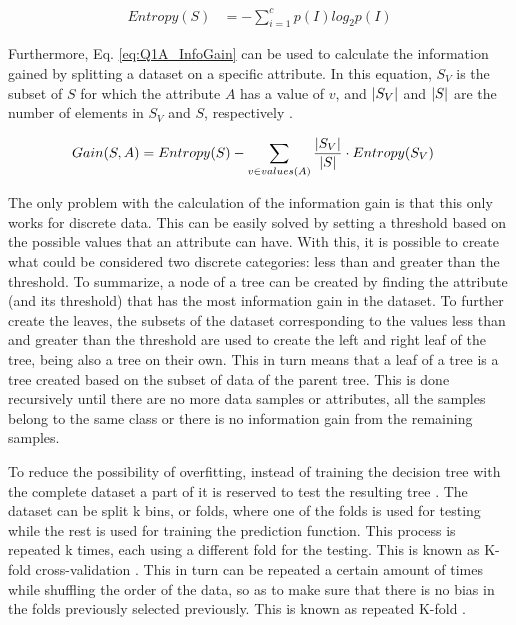 \documentclass{article}
\begin{document}
\begin{align}
    \label{eq:Q1A_Entropy}
    Entropy(S) &= -\sum_{i=1}^{c}p(I) log_2 p(I)
\end{align}

Furthermore, Eq. \ref{eq:Q1A_InfoGain} can be used to calculate the information gained by splitting a dataset on a specific attribute. In this equation, $S_V$ is the subset of $S$ for which the attribute $A$ has a value of $v$, and $\abs{S_V}$ and $\abs{S}$ are the number of elements in $S_V$ and $S$, respectively \cite{ID3Algo,SYDE675}.

\begin{align}
    \label{eq:Q1A_InfoGain}
    Gain(S, A) &= Entropy(S) - \sum_{v\in values(A)}{\frac{\abs{S_V}}{\abs{S}} \cdot Entropy(S_V)}
\end{align}

The only problem with the calculation of the information gain is that this only works for discrete data. This can be easily solved by setting a threshold based on the possible values that an attribute can have. With this, it is possible to create what could be considered two discrete categories: less than and greater than the threshold.
To summarize, a node of a tree can be created by finding the attribute (and its threshold) that has the most information gain in the dataset. To further create the leaves, the subsets of the dataset corresponding to the values less than and greater than the threshold are used to create the left and right leaf of the tree, being also a tree on their own. This in turn means that a leaf of a tree is a tree created based on the subset of data of the parent tree. This is done recursively until there are no more data samples or attributes, all the samples belong to the same class or there is no information gain from the remaining samples.

To reduce the possibility of overfitting, instead of training the decision tree with the complete dataset a part of it is reserved to test the resulting tree \cite{Cross_Val}. The dataset can be split k bins, or folds, where one of the folds is used for testing while the rest is used for training the prediction function. This process is repeated k times, each using a different fold for the testing. This is known as K-fold cross-validation \cite{k_fold}. This in turn can be repeated a certain amount of times while shuffling the order of the data, so as to make sure that there is no bias in the folds previously selected previously. This is known as repeated K-fold \cite{repeated_k_fold}.
\end{document}
